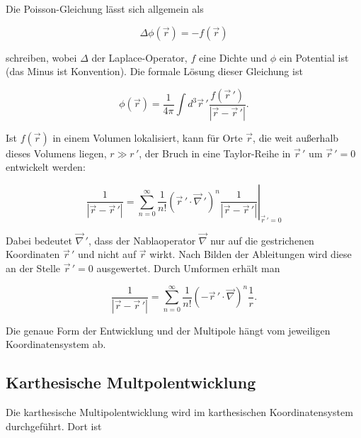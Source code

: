 Die Poisson-Gleichung lässt sich allgemein als

\begin{equation*}
\Delta \phi (\vec{r}) = - f (\vec{r})
\end{equation*}

\noindent
schreiben, wobei \(\Delta\) der Laplace-Operator, \(f\) eine Dichte und \(\phi\) ein Potential ist (das Minus ist Konvention).
Die formale Lösung dieser Gleichung ist

\begin{equation*}
\phi (\vec{r}) = \frac{1}{4\pi} \int d^3 \vec{r}\,' \frac{f (\vec{r}\,')} {\left| \vec{r} - \vec{r}\,' \right|}.
\end{equation*}

\noindent
Ist \(f (\vec{r})\) in einem Volumen lokalisiert, kann für Orte \(\vec{r}\), die weit außerhalb dieses Volumens liegen, \(r \gg r\,'\), der Bruch in eine Taylor-Reihe in \(\vec{r}\,'\) um \(\vec{r}\,' = 0\) entwickelt werden:

\begin{equation*}
\frac{1}{\left| \vec{r} - \vec{r}\,' \right|} = \sum_{n=0}^{\infty} \frac{1}{n!} \left( \vec{r}\,' \cdot \vec{\nabla}\,' \right)^n \left. \frac{1}{\left| \vec{r} - \vec{r}\,' \right|} \right|_{\vec{r}\,'=0}
\end{equation*}

\noindent
Dabei bedeutet \(\vec{\nabla}\,'\), dass der Nablaoperator \(\vec{\nabla}\) nur auf die gestrichenen Koordinaten \(\vec{r}\,'\) und nicht auf \(\vec{r}\) wirkt.
Nach Bilden der Ableitungen wird diese an der Stelle \(\vec{r}\,' = 0\) ausgewertet.
Durch Umformen erhält man

\begin{equation*}
\frac{1}{\left| \vec{r} - \vec{r}\,' \right|} = \sum_{n=0}^{\infty} \frac{1}{n!} \left( - \vec{r}\,' \cdot \vec{\nabla} \right)^n \frac{1}{r}.
\end{equation*}

\noindent
Die genaue Form der Entwicklung und der Multipole hängt vom jeweiligen Koordinatensystem ab.

\subsection{Karthesische Multpolentwicklung
\label{planet:subsection:kartentwicklung}}

Die karthesische Multipolentwicklung wird im karthesischen Koordinatensystem durchgeführt.
Dort ist

